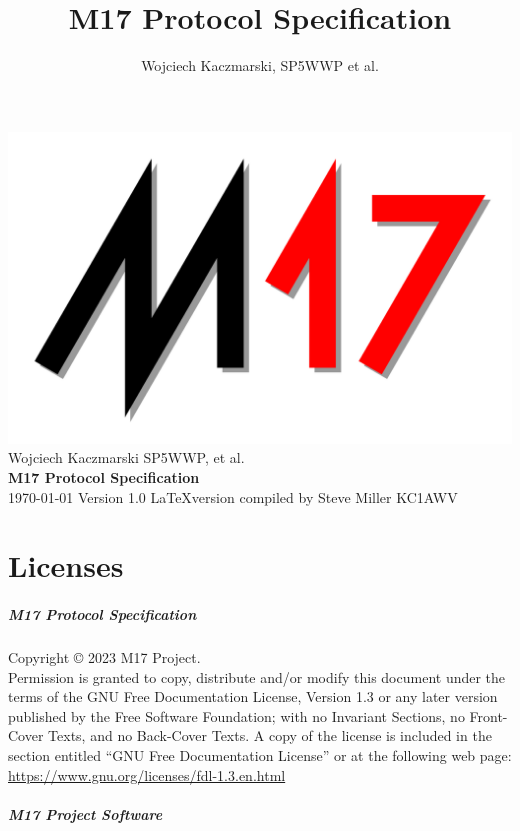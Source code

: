 \documentclass[a4paper,11pt]{book}
\title{M17 Protocol Specification}
\author{Wojciech Kaczmarski, SP5WWP et al.}
\makeatletter
\renewcommand{\frontmatter}{\cleardoublepage\@mainmatterfalse}
\makeatother
\begin{document}
\begin{titlepage}
	\raggedleft
	\includegraphics[width=0.7\linewidth,right]{img/m17_logo_shadow}
	\vspace*{\baselineskip}
	{\Large Wojciech Kaczmarski SP5WWP, et al.} \\
	\vspace*{0.167\textheight}
	\textbf{\LARGE M17 Protocol Specification} \\
	\today
	\vfill
	{\large Version 1.0}
	\vfill
	\LaTeX version compiled by Steve Miller KC1AWV
\end{titlepage}

\frontmatter

\tableofcontents

\listoftables

\listoffigures

\chapter{Licenses}

\paragraph{M17 Protocol Specification}

Copyright \copyright{}  2023  M17 Project. \\

Permission is granted to copy, distribute and/or modify this document under the terms of the GNU Free Documentation License, Version 1.3 or any later version published by the Free Software Foundation; with no Invariant Sections, no Front-Cover Texts, and no Back-Cover Texts. A copy of the license is included in the section entitled ``GNU Free Documentation License'' or at the following web page: \href{https://www.gnu.org/licenses/fdl-1.3.en.html}{https://www.gnu.org/licenses/fdl-1.3.en.html}

\paragraph{M17 Project Software}
\end{document}
